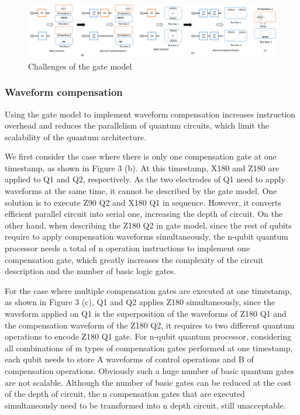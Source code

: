 \begin{figure}[ht]
  \centering
  \includegraphics[width=\linewidth]{figure/2_2}
  \caption{Challenges of the gate model}
  \label{img2_2}
\end{figure}


\subsubsection{Waveform compensation}
Using the gate model to implement waveform compensation increases instruction overhead and reduces the parallelism
of quantum circuits, which limit the scalability of the quantum architecture.

We first consider the case where there is only one compensation gate at one timestamp, 
as shown in Figure 3 (b). At this timestamp, X180 and Z180 are applied to Q1 and Q2, 
respectively. As the two electrodes of Q1 need to apply waveforms at the same time, 
it cannot be described by the gate model. One solution is to execute Z90 Q2 and X180 Q1 in sequence. 
However, it converts efficient parallel circuit into serial one, increasing the depth of circuit. 
On the other hand, when describing the Z180 Q2 in gate model, 
since the rest of qubits require to apply compensation waveforms simultaneously, 
the n-qubit quantum processor needs a total of n operation instructions to implement one compensation gate, 
which greatly increases the complexity of the circuit description and the number of basic logic gates.

For the case where multiple compensation gates are executed at one timestamp, 
as shown in Figure 3 (c), Q1 and Q2 applies Z180 simultaneously, 
since the waveform applied on Q1 is the superposition of the waveforms of Z180 Q1 and the compensation waveform of the Z180 Q2, 
it requires to two different quantum operations to encode Z180 Q1 gate. 
For n-qubit quantum processor, considering all combinations of m types of compensation gates performed at one timestamp, 
each qubit needs to store A waveforms of control operations and B of compensation operations. 
Obviously such a huge number of basic quantum gates are not scalable. 
Although the number of basic gates can be reduced at the cost of the depth of circuit, 
the n compensation gates that are executed simultaneously need to be transformed into n depth circuit, still unacceptable.

